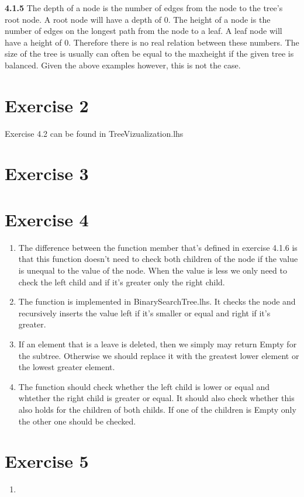 \documentclass{article}
\begin{document}
\textbf{4.1.5}
The depth of a node is the number of edges from the node to the tree's root node.
A root node will have a depth of 0.
The height of a node is the number of edges on the longest path from the node to a leaf.
A leaf node will have a height of 0. Therefore there is no real relation between these numbers. The size of the tree is usually can often be equal to the maxheight if the given tree is balanced. Given the above examples however, this is not the case.

\section*{Exercise 2}
Exercise 4.2 can be found in TreeVizualization.lhs

\section*{Exercise 3}


\section*{Exercise 4}
\begin{enumerate}
  \item The difference between the function member that's defined in exercise 4.1.6 is that this function doesn't need to check both children of the node if the value is unequal to the value of the node. When the value is less we only need to check the left child and if it's greater only the right child.
  \item The function is implemented in BinarySearchTree.lhs. It checks the node and recursively inserts the value left if it's smaller or equal and right if it's greater.
  \item If an element that is a leave is deleted, then we simply may return Empty for the subtree. Otherwise we should replace it with the greatest lower element or the lowest greater element.
  \item The function should check whether the left child is lower or equal and whtether the right child is greater or equal. It should also check whether this also holds for the children of both childs. If one of the children is Empty only the other one should be checked.
\end{enumerate}

\section*{Exercise 5}
\begin{enumerate}
  \item
\end{enumerate}
\end{document}
